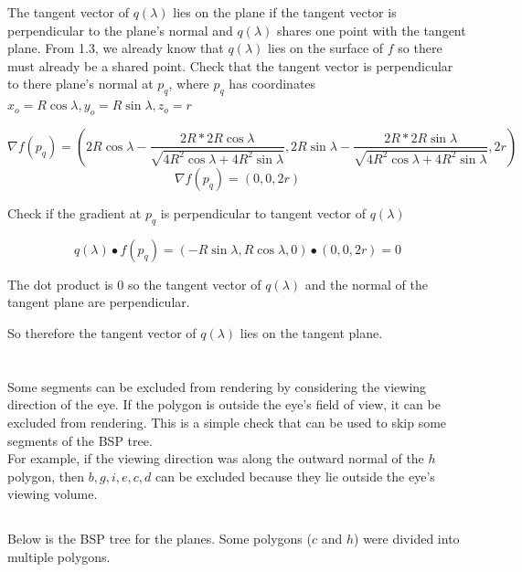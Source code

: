 \documentclass[a4paper,10pt]{scrartcl}
\begin{document}
The tangent vector of $q(\lambda)$ lies on the plane if the tangent vector is perpendicular to the plane's
normal and $q(\lambda)$ shares one point with the tangent plane. From 1.3, we already know that $q(\lambda)$ lies on
the surface of $f$ so there must already be a shared point. Check that the tangent vector is perpendicular to there
plane's normal at $p_q$, where $p_q$ has coordinates $x_o = R\cos\lambda, y_o = R\sin\lambda, z_o = r$

\[\nabla f(p_q) = (2R\cos\lambda - \frac{2R * 2R\cos\lambda}{\sqrt{4R^2\cos\lambda + 4R^2\sin\lambda}}, 2R\sin\lambda - \frac{2R * 2R\sin\lambda}{\sqrt{4R^2\cos\lambda + 4R^2\sin\lambda}}, 2r)\]
\[\nabla f(p_q) = (0, 0, 2r)\]

Check if the gradient at $p_q$ is perpendicular to tangent vector of $q(\lambda)$

\[q(\lambda) \bullet f(p_q) = (-R\sin\lambda, R\cos\lambda, 0) \bullet (0, 0, 2r) = 0\]

The dot product is $0$ so the tangent vector of $q(\lambda)$ and the normal of the tangent plane are perpendicular.

So therefore the tangent vector of $q(\lambda)$ lies on the tangent plane.


\section{}

\subsection{}
Some segments can be excluded from rendering by considering the viewing direction of the eye. If the
polygon is outside the eye's field of view, it can be excluded from rendering. This is a simple check that 
can be used to skip some segments of the BSP tree. \\

For example, if the viewing direction was along the outward normal of the $h$ polygon, then $b, g, i, e, c, d$ can be excluded
because they lie outside the eye's viewing volume.

\subsection{}

Below is the BSP tree for the planes. Some polygons ($c$ and $h$) were divided into multiple polygons.
\end{document}
